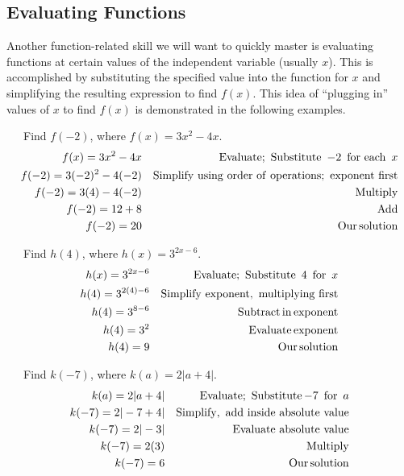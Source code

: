 \subsection{Evaluating Functions}


Another function-related skill we will want to quickly master is evaluating functions at certain values of the independent variable (usually $x$).  This is accomplished by substituting the specified value into the function for $x$ and simplifying the resulting expression to find $f(x)$.  This idea of ``plugging in'' values of $x$ to find $f(x)$ is demonstrated in the following examples.

\begin{example}~~~Find $f(-2)$, where $f(x)=3x^2-4x$.
  \begin{eqnarray*}
    f (x) = 3 x^2 - 4 x &  & \operatorname{Evaluate;~Substitute~} - 2
    \operatorname{~for~each~} x\\
    f (- 2) = 3 (- 2)^2 - 4 (- 2) &  & \operatorname{Simplify~using~order~of~operations;~exponent~first}\\
    f (- 2) = 3 (4) - 4 (- 2) &  & \operatorname{Multiply}\\
    f (- 2) = 12 + 8 &  & \operatorname{Add}\\
    f (- 2) = 20 &  & \operatorname{Our} \operatorname{solution}
  \end{eqnarray*}
\end{example}

\begin{example}~~~Find $h(4)$, where $h(x)=3^{2 x - 6}$.
  \begin{eqnarray*}
    h (x) = 3^{2 x - 6} &  & \operatorname{Evaluate;~Substitute~} 4
    \operatorname{~for~} x\\
    h (4) = 3^{2 (4) - 6} &  & \operatorname{Simplify~exponent,~multiplying~first}\\
    h (4) = 3^{8 - 6} &  & \operatorname{Subtract} \operatorname{in} \operatorname{exponent}\\
    h (4) = 3^2 &  & \operatorname{Evaluate} \operatorname{exponent}\\
    h (4) = 9 &  & \operatorname{Our} \operatorname{solution}
  \end{eqnarray*}
\end{example}

\begin{example}~~~Find $k(-7)$, where $k (a) = 2 |a + 4|$.
  \begin{eqnarray*}
    k (a) = 2 |a + 4| &  & \operatorname{Evaluate;~Substitute} -7
    \operatorname{~for~} a\\
    k (- 7) = 2| - 7 + 4| &  & \operatorname{Simplify,~add~inside~absolute~value}\\
    k (- 7) = 2| - 3| &  & \operatorname{Evaluate~absolute~value}\\
    k (- 7) = 2 (3) &  & \operatorname{Multiply}\\
    k (- 7) = 6 &  & \operatorname{Our} \operatorname{solution}
  \end{eqnarray*}
\end{example}

